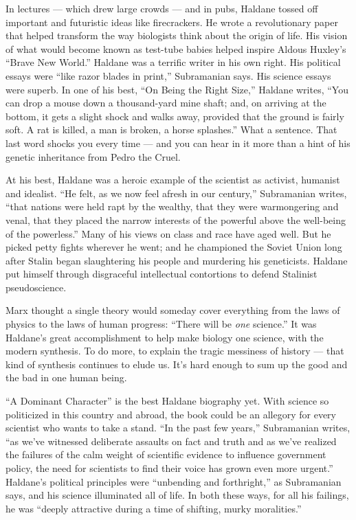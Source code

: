 In lectures --- which drew large crowds --- and in pubs, Haldane tossed
off important and futuristic ideas like firecrackers. He wrote a
revolutionary paper that helped transform the way biologists think about
the origin of life. His vision of what would become known as test-tube
babies helped inspire Aldous Huxley's ``Brave New World.'' Haldane was a
terrific writer in his own right. His political essays were ``like razor
blades in print,'' Subramanian says. His science essays were superb. In
one of his best, ``On Being the Right Size,'' Haldane writes, ``You can
drop a mouse down a thousand-yard mine shaft; and, on arriving at the
bottom, it gets a slight shock and walks away, provided that the ground
is fairly soft. A rat is killed, a man is broken, a horse splashes.''
What a sentence. That last word shocks you every time --- and you can
hear in it more than a hint of his genetic inheritance from Pedro the
Cruel.

At his best, Haldane was a heroic example of the scientist as activist,
humanist and idealist. ``He felt, as we now feel afresh in our
century,'' Subramanian writes, ``that nations were held rapt by the
wealthy, that they were warmongering and venal, that they placed the
narrow interests of the powerful above the well-being of the
powerless.'' Many of his views on class and race have aged well. But he
picked petty fights wherever he went; and he championed the Soviet Union
long after Stalin began slaughtering his people and murdering his
geneticists. Haldane put himself through disgraceful intellectual
contortions to defend Stalinist pseudoscience.

Marx thought a single theory would someday cover everything from the
laws of physics to the laws of human progress: ``There will be
\emph{one} science.'' It was Haldane's great accomplishment to help make
biology one science, with the modern synthesis. To do more, to explain
the tragic messiness of history --- that kind of synthesis continues to
elude us. It's hard enough to sum up the good and the bad in one human
being.

``A Dominant Character'' is the best Haldane biography yet. With science
so politicized in this country and abroad, the book could be an allegory
for every scientist who wants to take a stand. ``In the past few
years,'' Subramanian writes, ``as we've witnessed deliberate assaults on
fact and truth and as we've realized the failures of the calm weight of
scientific evidence to influence government policy, the need for
scientists to find their voice has grown even more urgent.'' Haldane's
political principles were ``unbending and forthright,'' as Subramanian
says, and his science illuminated all of life. In both these ways, for
all his failings, he was ``deeply attractive during a time of shifting,
murky moralities.''

